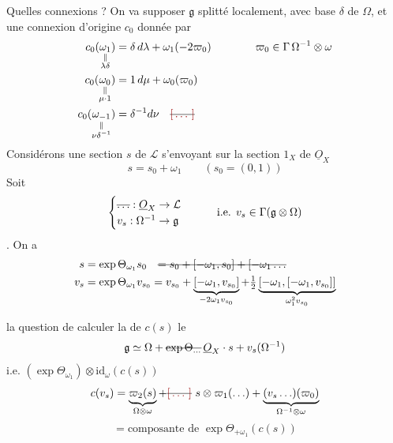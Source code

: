 \documentclass[11pt,a4paper]{article}
\begin{document}
Quelles connexions    ?   On va supposer $\mathfrak{g}$ splitté localement, avec base $\delta$ de $\Omega$, et une connexion d'origine $c_0$ donnée par
\[
\begin{aligned}
c_0(\underset{\substack{\|\\ \lambda\delta}}{\omega_1}) &= \delta\,d\lambda + \omega_1(-2\varpi_0) \qquad\qquad \varpi_0\in\Gamma\,\Omega^{-1}\otimes\omega\\
c_0(\underset{\substack{\|\\ \mu\cdot 1}}{\omega_0}) &= 1\,d\mu + \omega_0(\varpi_0)\\
c_0(\underset{\substack{\|\\ \nu\delta^{-1}}}{\omega_{-1}}) &= \delta^{-1}d\nu \quad \text{\struck{\ill{}}}
\end{aligned}
\]
Considérons une section $s$ de $\mathcal{L}$ s'envoyant sur la section $1_X$ de $\underline{O}_X$
\[
s = s_0 + \omega_1 \qquad (s_0 = (0,1))
\]
Soit
\[
\begin{cases}
\text{\struck{$\ldots$}} : \underline{O}_X \to \mathcal{L}\\
v_s : \Omega^{-1} \to \mathfrak{g}
\end{cases}
\qquad \text{i.e. } v_s \in \Gamma(\mathfrak{g}\otimes\Omega)
\]
  \uncertain{\ill{}} .  On a
\[
\begin{aligned}
s &= \exp\Theta_{\omega_1} s_0 \quad \text{\struck{$= s_0 + [-\omega_1, s_0] + [-\omega_1 \ldots$}}\\
v_s &= \exp\Theta_{\omega_1} v_{s_0} = v_{s_0} + \underbrace{[-\omega_1, v_{s_0}]}_{-2\omega_1 v_{s_0}} + \tfrac{1}{2}\underbrace{[-\omega_1,[-\omega_1, v_{s_0}]]}_{\omega_1^2 v_{s_0}}
\end{aligned}
\]

 la question   de calculer la   de $c(s)$  le \struck{\ill{}} \add{$\Omega\otimes\omega$} 
\[
\mathfrak{g} \simeq \Omega + \text{\struck{$\exp\Theta_{\ldots}$}}\,\underline{O}_X\cdot s + v_s(\Omega^{-1})
\]
i.e. $(\exp\Theta_{\omega_1})\otimes\mathrm{id}_{\omega}(c(s))$  
\[
c(v_s) = \underbrace{\varpi_2(s)}_{\Omega\otimes\omega} + \text{\struck{\ill{}}}\ s\otimes\varpi_1(\ldots) + \underbrace{(v_s\ldots)(\varpi_0)}_{\Omega^{-1}\otimes\omega}
\]
\[
= \text{composante de } \exp\Theta_{+\omega_1}(c(s))
\]
\end{document}
